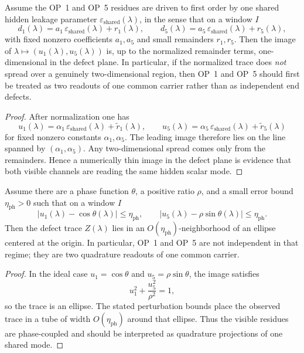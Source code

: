 \begin{proposition}
\label{prop:working-one-mode-image-test}
Assume the OP~1 and OP~5 residues are driven to first order by one shared hidden leakage parameter \(\varepsilon_{\mathrm{shared}}(\lambda)\), in the sense that on a window \(I\)
\[
  d_1(\lambda)=a_1\,\varepsilon_{\mathrm{shared}}(\lambda)+r_1(\lambda),
  \qquad
  d_5(\lambda)=a_5\,\varepsilon_{\mathrm{shared}}(\lambda)+r_5(\lambda),
\]
with fixed nonzero coefficients \(a_1,a_5\) and small remainders \(r_1,r_5\). Then the image of \(\lambda\mapsto (u_1(\lambda),u_5(\lambda))\) is, up to the normalized remainder terms, one-dimensional in the defect plane. In particular, if the normalized trace does \emph{not} spread over a genuinely two-dimensional region, then OP~1 and OP~5 should first be treated as two readouts of one common carrier rather than as independent end defects.
\end{proposition}

\begin{proof}
After normalization one has
\[
  u_1(\lambda)=\alpha_1\,\varepsilon_{\mathrm{shared}}(\lambda)+\tilde r_1(\lambda),
  \qquad
  u_5(\lambda)=\alpha_5\,\varepsilon_{\mathrm{shared}}(\lambda)+\tilde r_5(\lambda)
\]
for fixed nonzero constants \(\alpha_1,\alpha_5\). The leading image therefore lies on the line spanned by \((\alpha_1,\alpha_5)\). Any two-dimensional spread comes only from the remainders. Hence a numerically thin image in the defect plane is evidence that both visible channels are reading the same hidden scalar mode.
\end{proof}

\begin{proposition}
\label{prop:working-quadrature-criterion}
Assume there are a phase function \(\theta\), a positive ratio \(\rho\), and a small error bound \(\eta_{\mathrm{ph}}>0\) such that on a window \(I\)
\[
  |u_1(\lambda)-\cos\theta(\lambda)|\le \eta_{\mathrm{ph}},
  \qquad
  |u_5(\lambda)-\rho\sin\theta(\lambda)|\le \eta_{\mathrm{ph}}.
\]
Then the defect trace \(Z(\lambda)\) lies in an \(O(\eta_{\mathrm{ph}})\)-neighborhood of an ellipse centered at the origin. In particular, OP~1 and OP~5 are not independent in that regime; they are two quadrature readouts of one common carrier.
\end{proposition}

\begin{proof}
In the ideal case \(u_1=\cos\theta\) and \(u_5=\rho\sin\theta\), the image satisfies
\[
  u_1^2+\frac{u_5^2}{\rho^2}=1,
\]
so the trace is an ellipse. The stated perturbation bounds place the observed trace in a tube of width \(O(\eta_{\mathrm{ph}})\) around that ellipse. Thus the visible residues are phase-coupled and should be interpreted as quadrature projections of one shared mode.
\end{proof}

